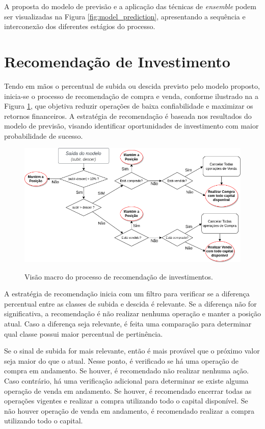 A proposta do modelo de previsão e a aplicação das técnicas de \textit{ensemble} podem ser visualizadas na Figura \ref{fig:model_prediction}, apresentando a sequência e interconexão dos diferentes estágios do processo.


\section{Recomendação de Investimento}
\label{sec:estrategia}

Tendo em mãos o percentual de subida ou descida previsto pelo modelo proposto, inicia-se o processo de recomendação de compra e venda, conforme ilustrado na a Figura \ref{fig:strategy}, que objetiva reduzir operações de baixa confiabilidade e maximizar os retornos financeiros. A estratégia de recomendação é baseada nos resultados do modelo de previsão, visando identificar oportunidades de investimento com maior probabilidade de sucesso.

\begin{figure}[htbp]
    \caption{Visão macro do processo de recomendação de investimentos.}
      \centering
    \includegraphics[width=.99\linewidth]{sections/images/strategy.png} 
    \label{fig:strategy}
\end{figure}

A estratégia de recomendação inicia com um filtro para verificar se a diferença percentual entre as classes de subida e descida é relevante. Se a diferença não for significativa, a recomendação é não realizar nenhuma operação e manter a posição atual. Caso a diferença seja relevante, é feita uma comparação para determinar qual classe possui maior percentual de pertinência.

Se o sinal de subida for mais relevante, então é mais provável que o próximo valor seja maior do que o atual. Nesse ponto, é verificado se há uma operação de compra em andamento. Se houver, é recomendado não realizar nenhuma ação. Caso contrário, há uma verificação adicional para determinar se existe alguma operação de venda em andamento. Se houver, é recomendado encerrar todas as operações vigentes e realizar a compra utilizando todo o capital disponível. Se não houver operação de venda em andamento, é recomendado realizar a compra utilizando todo o capital.

